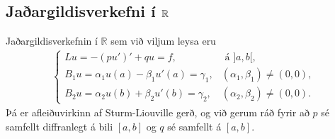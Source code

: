 \documentclass[a4paper,10pt,icelandic]{sphinxmanual}
\begin{document}
\subsection{Jaðargildisverkefni í \protect\(\mathbb R\protect\)}
\label{\detokenize{Kafli06:jaargildisverkefni-i-mathbb-r}}\label{\detokenize{Kafli06:ch-6-1-1}}
Jaðargildisverkefnin í \(\mathbb R\) sem við viljum leysa eru
\begin{equation}\label{equation:Kafli06:eq.system1}
\begin{split}\begin{cases}
Lu=-(pu')'+qu=f,& \text{ á } ]a,b[,\\
B_1u=\alpha_1u(a)-\beta_1u'(a)=\gamma_1,&(\alpha_1,\beta_1)\neq (0,0),\\
B_2u=\alpha_2u(b)+\beta_2u'(b)=\gamma_2,&(\alpha_2,\beta_2)\neq (0,0).
\end{cases}\end{split}
\end{equation}
Þá er  afleiðuvirkinn af Sturm-Liouville gerð, og við gerum ráð fyrir að \(p\) sé samfellt diffranlegt á bili \([a,b]\) og \(q\) sé samfellt á  \([a,b]\).
\end{document}
